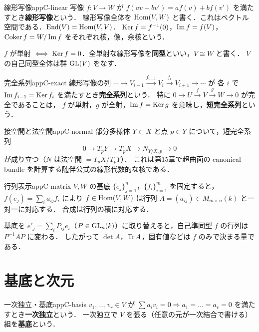 \begin{mydef}{線形写像}{appC-linear}
写像 $f\colon V\to W$ が $f(av+bv')=af(v)+bf(v')$ を満たすとき\textbf{線形写像}という．
線形写像全体を $\operatorname{Hom}(V,W)$ と書く．これはベクトル空間である．$\operatorname{End}(V)=\operatorname{Hom}(V,V)$．
$\operatorname{Ker} f=f^{-1}(0)$，$\operatorname{Im} f=f(V)$，$\operatorname{Coker} f=W/\operatorname{Im} f$ をそれぞれ核，像，余核という．
\end{mydef}

$f$ が単射 $\iff\operatorname{Ker} f=0$．全単射な線形写像を\textbf{同型}といい，$V\cong W$ と書く．
$V$ の自己同型全体は群 $\operatorname{GL}(V)$ をなす．

\begin{mydef}{完全系列}{appC-exact}
線形写像の列 $\cdots\to V_{i-1}\xrightarrow{f_{i-1}}V_i\xrightarrow{f_i}V_{i+1}\to\cdots$ が
各 $i$ で $\operatorname{Im} f_{i-1}=\operatorname{Ker} f_i$ を満たすとき\textbf{完全系列}という．
特に $0\to U\xrightarrow{f}V\xrightarrow{g}W\to0$ が完全であることは，
$f$ が単射，$g$ が全射，$\operatorname{Im} f=\operatorname{Ker} g$ を意味し，\textbf{短完全系列}という．
\end{mydef}

\begin{myex}{接空間と法空間}{appC-normal}
部分多様体 $Y\subset X$ と点 $p\in Y$ について，短完全系列
\[
0\to T_pY\to T_pX\to N_{Y/X,p}\to0
\]
が成り立つ（$N$ は法空間 $=T_pX/T_pY$）．
これは第15章で超曲面の canonical bundle を計算する随伴公式の線形代数的な核である．
\end{myex}

\begin{mydef}{行列表示}{appC-matrix}
$V,W$ の基底 $\{e_j\}_{j=1}^n$，$\{f_i\}_{i=1}^m$ を固定すると，
$f(e_j)=\sum_ia_{ij}f_i$ により $f\in\operatorname{Hom}(V,W)$ は行列 $A=(a_{ij})\in M_{m\times n}(k)$ と一対一に対応する．
合成は行列の積に対応する．
\end{mydef}

基底を $e'_j=\sum_i P_{ij}e_i$（$P\in\operatorname{GL}_n(k)$）に取り替えると，自己準同型 $f$ の行列は $P^{-1}AP$ に変わる．
したがって $\det A$，$\operatorname{Tr} A$，固有値などは $f$ のみで決まる量である．

\section{基底と次元}

\begin{mydef}{一次独立・基底}{appC-basis}
$v_1,\dots,v_r\in V$ が $\sum a_iv_i=0\Rightarrow a_1=\dots=a_r=0$ を満たすとき\textbf{一次独立}という．
一次独立で $V$ を張る（任意の元が一次結合で書ける）組を\textbf{基底}という．
\end{mydef}

